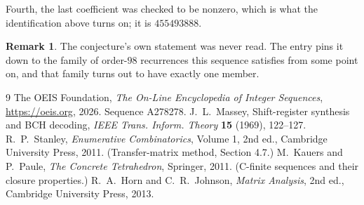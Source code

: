 \documentclass[11pt,a4paper]{article}
\theoremstyle{plain}
\theoremstyle{definition}
\newtheorem{remark}[theorem]{Remark}
\begin{document}
Fourth, the last coefficient was checked to be nonzero, which is what the identification above
turns on; it is $455493888$.

\begin{remark}
The conjecture's own statement was never read. The entry pins it down to the family of
order-$98$ recurrences this sequence satisfies from some point on, and that family turns
out to have exactly one member.
\end{remark}

\begin{thebibliography}{9}
 The OEIS Foundation, \emph{The On-Line Encyclopedia of Integer
Sequences}, \url{https://oeis.org}, 2026. Sequence A278278.
 J.~L.~Massey, Shift-register synthesis and BCH decoding, \emph{IEEE
Trans. Inform. Theory} \textbf{15} (1969), 122--127.
 R.~P.~Stanley, \emph{Enumerative Combinatorics}, Volume 1, 2nd ed.,
Cambridge University Press, 2011. (Transfer-matrix method, Section 4.7.)
 M.~Kauers and P.~Paule, \emph{The Concrete Tetrahedron}, Springer, 2011.
(C-finite sequences and their closure properties.)
 R.~A.~Horn and C.~R.~Johnson, \emph{Matrix Analysis}, 2nd ed., Cambridge
University Press, 2013.
\end{thebibliography}
\end{document}
